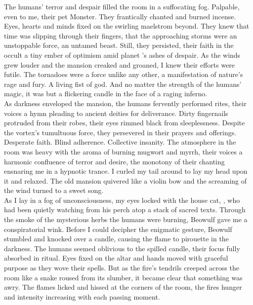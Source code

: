 
The humans' terror and despair filled the room in a suffocating fog. Palpable, even to me, their pet  Monster. They frantically chanted and burned incense. Eyes, hearts and minds fixed on the swirling maelstrom beyond. They knew that time was slipping through their fingers, that the approaching storms were an unstoppable force, an untamed beast. Still, they persisted, their faith in the occult a tiny ember of optimism amid planet 's ashes of despair. As the winds grew louder and the mansion creaked and groaned, I knew their efforts were futile. The tornadoes were a force unlike any other, a manifestation of nature's rage and fury. A living fist of god. And no matter the strength of the humans' magic, it was but a flickering candle in the face of a raging inferno. \\

As darkness enveloped the mansion, the humans fervently performed rites, their voices a hymn pleading to ancient deities for deliverance. Dirty fingernails protruded from their robes, their eyes rimmed black from sleeplessness. Despite the vortex's tumultuous force, they persevered in their prayers and offerings. Desperate faith. Blind adherence. Collective insanity. The atmosphere in the room was heavy with the aroma of burning mugwort and myrrh, their voices a harmonic confluence of terror and desire, the monotony of their chanting ensnaring me in a hypnotic trance. I curled my tail around to lay my head upon it and relaxed. The old mansion quivered like a violin bow and the screaming of the wind turned to a sweet song. \\

As I lay in a fog of unconsciousness, my eyes locked with the house cat, , who had been quietly watching from his perch atop a stack of sacred texts. Through the smoke of the mysterious herbs the humans were burning, Beowulf gave me a conspiratorial wink. Before I could decipher the enigmatic gesture, Beowulf stumbled and knocked over a candle, causing the flame to pirouette in the darkness. The humans seemed oblivious to the spilled candle, their focus fully absorbed in ritual. Eyes fixed on the altar and hands moved with graceful purpose as they wove their spells. But as the fire's tendrils creeped across the room like a snake roused from its slumber, it became clear that something was awry. The flames licked and hissed at the corners of the room, the fires hunger and intensity increasing with each passing moment. \\

